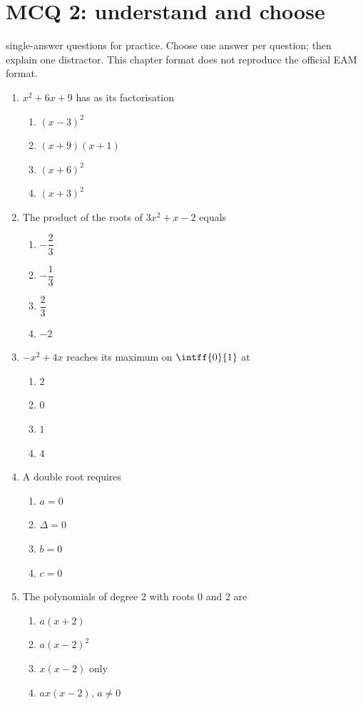 \endgroup
\begingroup\small
{}\section*{MCQ 2: understand and choose}\label{C02-Q2}
 single-answer questions for practice. Choose one answer per question; then explain one distractor. This chapter format does not reproduce the official EAM format.
\begin{enumerate}
\item $x^2+6x+9$ has as its factorisation
\begin{enumerate}[label=\Alph*.,itemsep=2pt]
\item $(x-3)^2$
\item $(x+9)(x+1)$
\item $(x+6)^2$
\item $(x+3)^2$
\end{enumerate}
\item The product of the roots of $3x^2+x-2$ equals
\begin{enumerate}[label=\Alph*.,itemsep=2pt]
\item $-\dfrac{2}{3}$
\item $-\dfrac{1}{3}$
\item $\dfrac{2}{3}$
\item $-2$
\end{enumerate}
\item $-x^2+4x$ reaches its maximum on $\intff{0}{1}$ at
\begin{enumerate}[label=\Alph*.,itemsep=2pt]
\item $2$
\item $0$
\item $1$
\item $4$
\end{enumerate}
\item A double root requires
\begin{enumerate}[label=\Alph*.,itemsep=2pt]
\item $a=0$
\item $\Delta=0$
\item $b=0$
\item $c=0$
\end{enumerate}
\item The polynomials of degree 2 with roots 0 and 2 are
\begin{enumerate}[label=\Alph*.,itemsep=2pt]
\item $a(x+2)$
\item $a(x-2)^2$
\item $x(x-2)$ only
\item $ax(x-2)$, $a\ne0$
\end{enumerate}
\end{enumerate}
